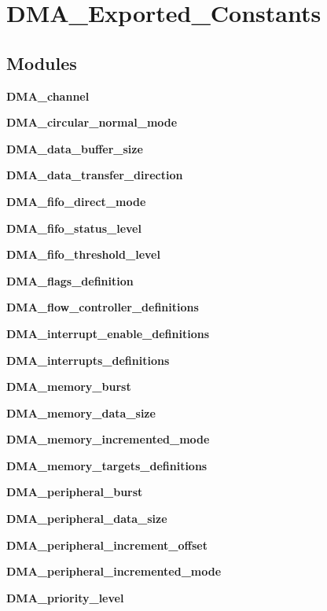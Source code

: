 \section{D\+M\+A\+\_\+\+Exported\+\_\+\+Constants}
\label{group__DMA__Exported__Constants}
\subsection*{Modules}
\begin{DoxyCompactItemize}
\item 
\textbf{ D\+M\+A\+\_\+channel}
\item 
\textbf{ D\+M\+A\+\_\+circular\+\_\+normal\+\_\+mode}
\item 
\textbf{ D\+M\+A\+\_\+data\+\_\+buffer\+\_\+size}
\item 
\textbf{ D\+M\+A\+\_\+data\+\_\+transfer\+\_\+direction}
\item 
\textbf{ D\+M\+A\+\_\+fifo\+\_\+direct\+\_\+mode}
\item 
\textbf{ D\+M\+A\+\_\+fifo\+\_\+status\+\_\+level}
\item 
\textbf{ D\+M\+A\+\_\+fifo\+\_\+threshold\+\_\+level}
\item 
\textbf{ D\+M\+A\+\_\+flags\+\_\+definition}
\item 
\textbf{ D\+M\+A\+\_\+flow\+\_\+controller\+\_\+definitions}
\item 
\textbf{ D\+M\+A\+\_\+interrupt\+\_\+enable\+\_\+definitions}
\item 
\textbf{ D\+M\+A\+\_\+interrupts\+\_\+definitions}
\item 
\textbf{ D\+M\+A\+\_\+memory\+\_\+burst}
\item 
\textbf{ D\+M\+A\+\_\+memory\+\_\+data\+\_\+size}
\item 
\textbf{ D\+M\+A\+\_\+memory\+\_\+incremented\+\_\+mode}
\item 
\textbf{ D\+M\+A\+\_\+memory\+\_\+targets\+\_\+definitions}
\item 
\textbf{ D\+M\+A\+\_\+peripheral\+\_\+burst}
\item 
\textbf{ D\+M\+A\+\_\+peripheral\+\_\+data\+\_\+size}
\item 
\textbf{ D\+M\+A\+\_\+peripheral\+\_\+increment\+\_\+offset}
\item 
\textbf{ D\+M\+A\+\_\+peripheral\+\_\+incremented\+\_\+mode}
\item 
\textbf{ D\+M\+A\+\_\+priority\+\_\+level}
\end{DoxyCompactItemize}
